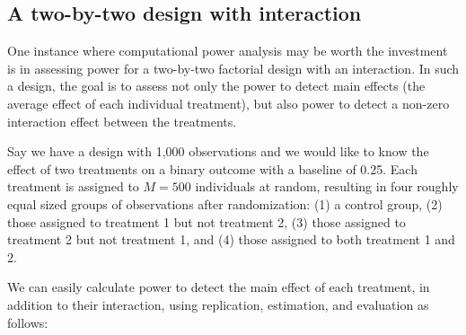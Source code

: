 \documentclass[
  12pt,
]{book}
\newenvironment{Shaded}{\begin{snugshade}}{\end{snugshade}}
\newcommand{\CommentTok}[1]{\textcolor[rgb]{0.56,0.35,0.01}{\textit{#1}}}
\newcommand{\DataTypeTok}[1]{\textcolor[rgb]{0.13,0.29,0.53}{#1}}
\newcommand{\DecValTok}[1]{\textcolor[rgb]{0.00,0.00,0.81}{#1}}
\newcommand{\FloatTok}[1]{\textcolor[rgb]{0.00,0.00,0.81}{#1}}
\newcommand{\KeywordTok}[1]{\textcolor[rgb]{0.13,0.29,0.53}{\textbf{#1}}}
\newcommand{\NormalTok}[1]{#1}
\newcommand{\OperatorTok}[1]{\textcolor[rgb]{0.81,0.36,0.00}{\textbf{#1}}}
\newcommand{\StringTok}[1]{\textcolor[rgb]{0.31,0.60,0.02}{#1}}
\theoremstyle{definition}
\theoremstyle{definition}
\theoremstyle{definition}
\theoremstyle{remark}
\begin{document}
\hypertarget{a-two-by-two-design-with-interaction}{%
\subsection{A two-by-two design with
interaction}\label{a-two-by-two-design-with-interaction}}

One instance where computational power analysis may be worth the
investment is in assessing power for a two-by-two factorial design with
an interaction. In such a design, the goal is to assess not only the
power to detect main effects (the average effect of each individual
treatment), but also power to detect a non-zero interaction effect
between the treatments.

Say we have a design with 1,000 observations and we would like to know
the effect of two treatments on a binary outcome with a baseline of
0.25. Each treatment is assigned to \(M = 500\) individuals at random,
resulting in four roughly equal sized groups of observations after
randomization: (1) a control group, (2) those assigned to treatment 1
but not treatment 2, (3) those assigned to treatment 2 but not treatment
1, and (4) those assigned to both treatment 1 and 2.

We can easily calculate power to detect the main effect of each
treatment, in addition to their interaction, using replication,
estimation, and evaluation as follows:

\begin{Shaded}
\end{Shaded}
\end{document}
